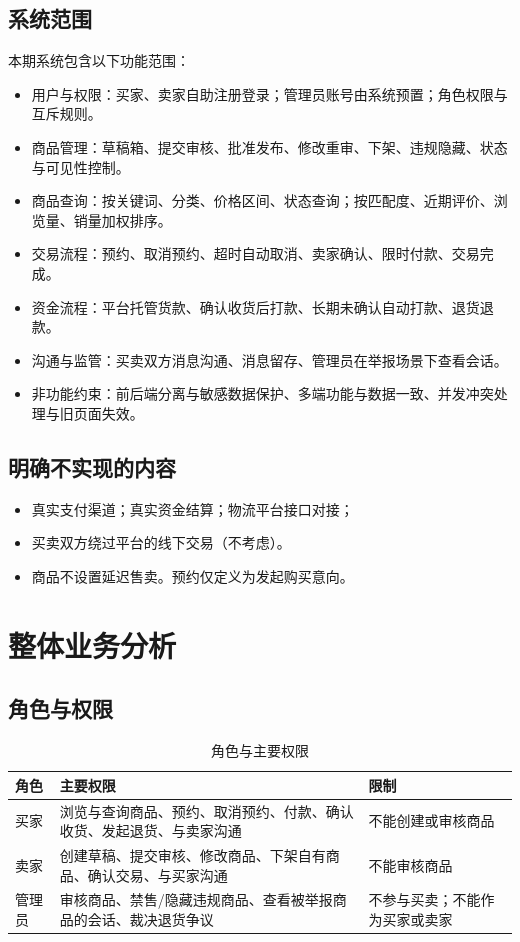\documentclass[UTF8,a4paper,zihao=-4]{ctexart}
\begin{document}
\subsection{系统范围}

本期系统包含以下功能范围：

\begin{itemize}
  \item 用户与权限：买家、卖家自助注册登录；管理员账号由系统预置；角色权限与互斥规则。
  \item 商品管理：草稿箱、提交审核、批准发布、修改重审、下架、违规隐藏、状态与可见性控制。
  \item 商品查询：按关键词、分类、价格区间、状态查询；按匹配度、近期评价、浏览量、销量加权排序。
  \item 交易流程：预约、取消预约、超时自动取消、卖家确认、限时付款、交易完成。
  \item 资金流程：平台托管货款、确认收货后打款、长期未确认自动打款、退货退款。
  \item 沟通与监管：买卖双方消息沟通、消息留存、管理员在举报场景下查看会话。
  \item 非功能约束：前后端分离与敏感数据保护、多端功能与数据一致、并发冲突处理与旧页面失效。
\end{itemize}

\subsection{明确不实现的内容}
\begin{itemize}
  \item 真实支付渠道；真实资金结算；物流平台接口对接；
  \item 买卖双方绕过平台的线下交易（不考虑）。
  \item 商品不设置延迟售卖。预约仅定义为发起购买意向。
\end{itemize}

\section{整体业务分析}

\subsection{角色与权限}

\begin{table}[H]
\centering
\caption{角色与主要权限}
\begin{tabular}{p{2.4cm}p{8.6cm}p{3.6cm}}
\toprule
角色 & 主要权限 & 限制 \\
\midrule
买家 & 浏览与查询商品、预约、取消预约、付款、确认收货、发起退货、与卖家沟通 & 不能创建或审核商品 \\
卖家 & 创建草稿、提交审核、修改商品、下架自有商品、确认交易、与买家沟通 & 不能审核商品 \\
管理员 & 审核商品、禁售/隐藏违规商品、查看被举报商品的会话、裁决退货争议 & 不参与买卖；不能作为买家或卖家 \\
\bottomrule
\end{tabular}
\end{table}
\end{document}
